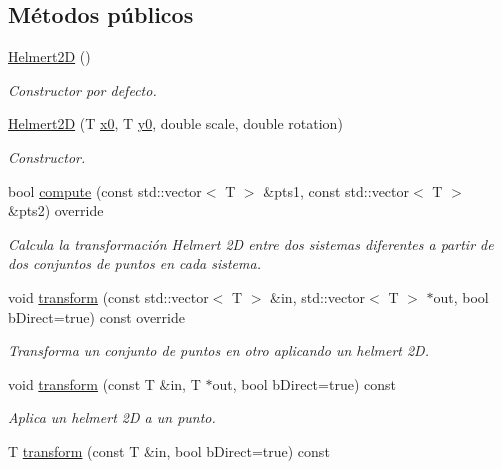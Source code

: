 \subsection*{Métodos públicos}
\begin{DoxyCompactItemize}
\item 
\hyperlink{class_i3_d_1_1_helmert2_d_a8eca7720410824fb11469d8d893fb2d6}{Helmert2D} ()
\begin{DoxyCompactList}\small\item\em Constructor por defecto. \end{DoxyCompactList}\item 
\hyperlink{class_i3_d_1_1_helmert2_d_acc703bb59be7931c8c1ce6d6ebeb89fd}{Helmert2D} (T \hyperlink{class_i3_d_1_1_helmert2_d_ad0bb6ad335ff383cf85f29a3da60c2e7}{x0}, T \hyperlink{class_i3_d_1_1_helmert2_d_a60ddf8a70434410bc53e610abf583dbe}{y0}, double scale, double rotation)
\begin{DoxyCompactList}\small\item\em Constructor. \end{DoxyCompactList}\item 
bool \hyperlink{group__trf2_d_group_ga300279dee0a002835c25322bd2ea9398}{compute} (const std\+::vector$<$ T $>$ \&pts1, const std\+::vector$<$ T $>$ \&pts2) override
\begin{DoxyCompactList}\small\item\em Calcula la transformación Helmert 2D entre dos sistemas diferentes a partir de dos conjuntos de puntos en cada sistema. \end{DoxyCompactList}\item 
void \hyperlink{group__trf2_d_group_gab7354b67b291bf01b3fd045578598fb1}{transform} (const std\+::vector$<$ T $>$ \&in, std\+::vector$<$ T $>$ $\ast$out, bool b\+Direct=true) const  override
\begin{DoxyCompactList}\small\item\em Transforma un conjunto de puntos en otro aplicando un helmert 2D. \end{DoxyCompactList}\item 
void \hyperlink{group__trf2_d_group_ga11e1634259f4e3085840a16c3bfb314e}{transform} (const T \&in, T $\ast$out, bool b\+Direct=true) const 
\begin{DoxyCompactList}\small\item\em Aplica un helmert 2D a un punto. \end{DoxyCompactList}\item 
T \hyperlink{group__trf2_d_group_gaa9495c4b5fe0dbfb703a2004b41e310b}{transform} (const T \&in, bool b\+Direct=true) const 

\end{DoxyCompactItemize}
